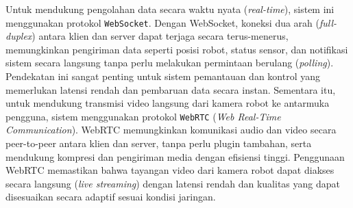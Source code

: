 Untuk mendukung pengolahan data secara waktu nyata (\textit{real-time}), sistem ini menggunakan protokol \texttt{WebSocket}. Dengan WebSocket, koneksi dua arah (\textit{full-duplex}) antara klien dan server dapat terjaga secara terus-menerus, memungkinkan pengiriman data seperti posisi robot, status sensor, dan notifikasi sistem secara langsung tanpa perlu melakukan permintaan berulang (\textit{polling}). Pendekatan ini sangat penting untuk sistem pemantauan dan kontrol yang memerlukan latensi rendah dan pembaruan data secara instan. Sementara itu, untuk mendukung transmisi video langsung dari kamera robot ke antarmuka pengguna, sistem menggunakan protokol \texttt{WebRTC} (\textit{Web Real-Time Communication}). WebRTC memungkinkan komunikasi audio dan video secara peer-to-peer antara klien dan server, tanpa perlu plugin tambahan, serta mendukung kompresi dan pengiriman media dengan efisiensi tinggi. Penggunaan WebRTC memastikan bahwa tayangan video dari kamera robot dapat diakses secara langsung (\textit{live streaming}) dengan latensi rendah dan kualitas yang dapat disesuaikan secara adaptif sesuai kondisi jaringan.

